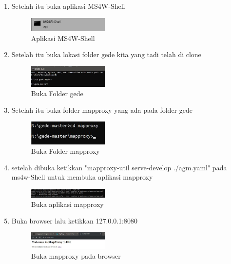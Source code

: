 \begin{enumerate}
  \item Setelah itu buka aplikasi MS4W-Shell
  \hfill\break
  \begin{figure}[H]
  \includegraphics[width=4cm]{figures/tugas4/1174079/10.jpg}
  \centering
  \caption{Aplikasi MS4W-Shell}
  \end{figure}

  \item Setelah itu buka lokasi folder gede kita yang tadi telah di clone
  \hfill\break
  \begin{figure}[H]
  \includegraphics[width=4cm]{figures/tugas4/1174079/12.jpg}
  \centering
  \caption{Buka Folder gede}
  \end{figure}

  \item Setelah itu buka folder mapproxy yang ada pada folder gede
  \hfill\break
  \begin{figure}[H]
  \includegraphics[width=4cm]{figures/tugas4/1174079/17.jpg}
  \centering
  \caption{Buka Folder mapproxy}
  \end{figure}

  \item setelah dibuka ketikkan "mapproxy-util serve-develop ./agm.yaml" pada ms4w-Shell untuk membuka aplikasi mapproxy
  \hfill\break
  \begin{figure}[H]
  \includegraphics[width=4cm]{figures/tugas4/1174079/18.jpg}
  \centering
  \caption{Buka aplikasi mapproxy}
  \end{figure}
  
  \item Buka browser lalu ketikkan 127.0.0.1:8080
  \hfill\break
  \begin{figure}[H]
  \includegraphics[width=4cm]{figures/tugas4/1174079/19.jpg}
  \centering
  \caption{Buka mapproxy pada browser}
  \end{figure}


\end{enumerate}
